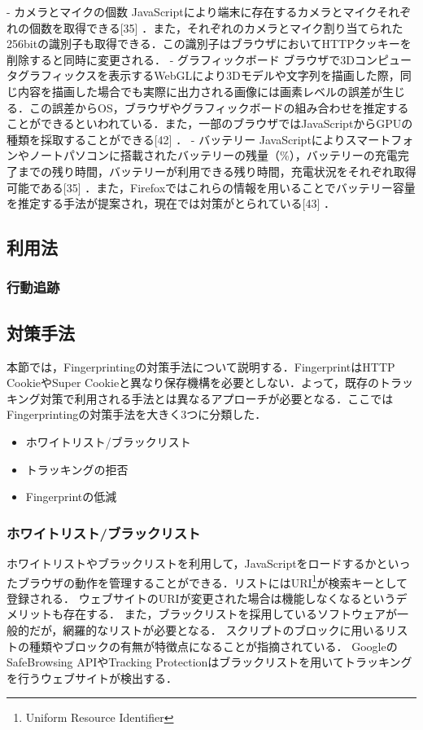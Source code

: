 \begin{description}
-	カメラとマイクの個数
JavaScriptにより端末に存在するカメラとマイクそれぞれの個数を取得できる[35] ．また，それぞれのカメラとマイク割り当てられた256bitの識別子も取得できる．この識別子はブラウザにおいてHTTPクッキーを削除すると同時に変更される．
-	グラフィックボード
ブラウザで3Dコンピュータグラフィックスを表示するWebGLにより3Dモデルや文字列を描画した際，同じ内容を描画した場合でも実際に出力される画像には画素レベルの誤差が生じる．この誤差からOS，ブラウザやグラフィックボードの組み合わせを推定することができるといわれている．また，一部のブラウザではJavaScriptからGPUの種類を採取することができる[42] ．
-	バッテリー
JavaScriptによりスマートフォンやノートパソコンに搭載されたバッテリーの残量（\%），バッテリーの充電完了までの残り時間，バッテリーが利用できる残り時間，充電状況をそれぞれ取得可能である[35] ．また，Firefoxではこれらの情報を用いることでバッテリー容量を推定する手法が提案され，現在では対策がとられている[43] ． 

\end{description}
\subsection{利用法}
\subsubsection{行動追跡}
\subsection{対策手法}
本節では，Fingerprintingの対策手法について説明する．FingerprintはHTTP CookieやSuper Cookieと異なり保存機構を必要としない．よって，既存のトラッキング対策で利用される手法とは異なるアプローチが必要となる．ここではFingerprintingの対策手法を大きく3つに分類した．
\begin{itemize}
\item ホワイトリスト/ブラックリスト
\item トラッキングの拒否
\item Fingerprintの低減
\end{itemize}
\subsubsection{ホワイトリスト/ブラックリスト}
ホワイトリストやブラックリストを利用して，JavaScriptをロードするかといったブラウザの動作を管理することができる．リストにはURI\footnote{Uniform Resource Identifier}が検索キーとして登録される．
ウェブサイトのURIが変更された場合は機能しなくなるというデメリットも存在する．
また，ブラックリストを採用しているソフトウェアが一般的だが，網羅的なリストが必要となる．
スクリプトのブロックに用いるリストの種類やブロックの有無が特徴点になることが指摘されている．
GoogleのSafeBrowsing APIやTracking Protectionはブラックリストを用いてトラッキングを行うウェブサイトが検出する．

